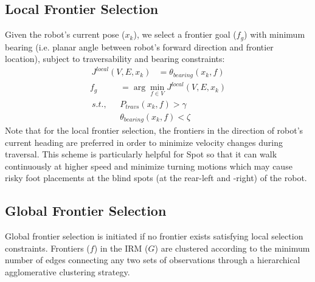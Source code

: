 \documentclass[a4paper, 10pt, conference]{ieeeconf}      %
\begin{document}
\subsection{Local Frontier Selection}
Given the robot's current pose ($x_k$), we select a frontier goal ($f_g$) with minimum bearing (i.e. planar angle between robot's forward direction and frontier location), subject to traversability and bearing constraints:
\begin{align}
    J^{local}(V, E, x_k) &= \theta_{bearing}(x_k, f) 
\end{align}
\begin{align}
    f_g &= \arg\min_{f\in V} J^{local}(V, E, x_k)\\
    ~s.t.,~~~ & P_{travs}(x_k, f) > \gamma \nonumber \\
    & \theta_{bearing}(x_k, f) < \zeta \nonumber
\end{align}
Note that for the local frontier selection, the frontiers in the direction of robot's current heading are preferred in order to minimize velocity changes during traversal. This scheme is particularly helpful for Spot so that it can walk continuously at higher speed and minimize turning motions which may cause risky foot placements at the blind spots (at the rear-left and -right) of the robot.
\subsection{Global Frontier Selection}
Global frontier selection is initiated if no frontier exists satisfying local selection constraints. Frontiers ($f$) in the IRM ($G$) are clustered according to the minimum number of edges connecting any two sets of observations through a hierarchical agglomerative clustering strategy. 
\end{document}

